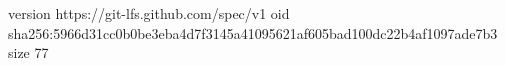 version https://git-lfs.github.com/spec/v1
oid sha256:5966d31cc0b0be3eba4d7f3145a41095621af605bad100dc22b4af1097ade7b3
size 77
